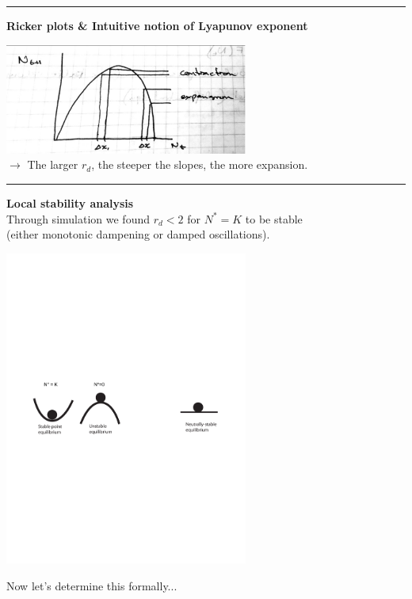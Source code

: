 \documentclass{article}
\newcommand{\ind}{\-\hspace{1cm}}
\begin{document}
\noindent{}
\rule[0.5ex]{\linewidth}{1pt}

\textbf{Ricker plots \& Intuitive notion of Lyapunov exponent}
\begin{center}
\includegraphics[width=8cm]{figs/RickerLyapunov.pdf}\\
$\to$ The larger $r_d$, the steeper the slopes, the more expansion.
\end{center}

\rule[0.5ex]{\linewidth}{1pt}

\textbf{Local stability analysis}\\
Through simulation we found $r_d<2$ for $N^*=K$ to be stable\\
\ind (either monotonic dampening or damped oscillations).
\begin{center}
\includegraphics[width=8cm]{figs/ballcup2.pdf}
\end{center}

Now let's determine this formally...
\end{document}
